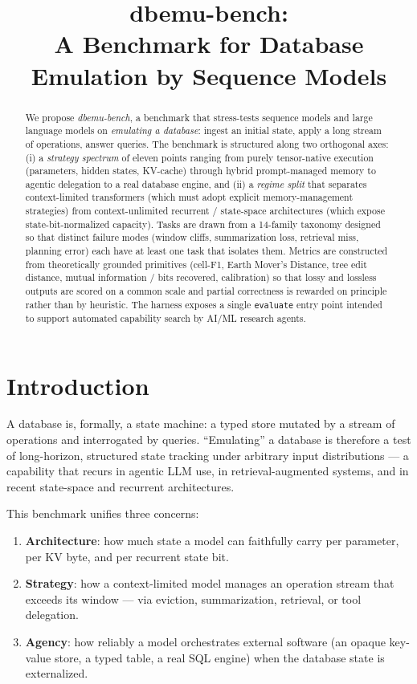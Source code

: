 \documentclass[11pt]{article}
\title{\textbf{dbemu-bench}: \\
A Benchmark for Database Emulation by Sequence Models}
\author{}
\date{}
\begin{document}
\maketitle

\begin{abstract}
We propose \emph{dbemu-bench}, a benchmark that stress-tests sequence
models and large language models on \emph{emulating a database}: ingest an
initial state, apply a long stream of operations, answer queries. The
benchmark is structured along two orthogonal axes: (i) a
\emph{strategy spectrum} of eleven points ranging from purely
tensor-native execution (parameters, hidden states, KV-cache) through
hybrid prompt-managed memory to agentic delegation to a real database
engine, and (ii) a \emph{regime split} that separates context-limited
transformers (which must adopt explicit memory-management strategies) from
context-unlimited recurrent / state-space architectures (which expose
state-bit-normalized capacity). Tasks are drawn from a 14-family taxonomy
designed so that distinct failure modes (window cliffs, summarization
loss, retrieval miss, planning error) each have at least one task that
isolates them. Metrics are constructed from theoretically grounded
primitives (cell-F1, Earth Mover's Distance, tree edit distance, mutual
information / bits recovered, calibration) so that lossy and lossless
outputs are scored on a common scale and partial correctness is rewarded
on principle rather than by heuristic. The harness exposes a single
\texttt{evaluate} entry point intended to support automated capability
search by AI/ML research agents.
\end{abstract}

\section{Introduction}

A database is, formally, a state machine: a typed store mutated by a
stream of operations and interrogated by queries. ``Emulating'' a
database is therefore a test of long-horizon, structured state tracking
under arbitrary input distributions --- a capability that recurs in
agentic LLM use, in retrieval-augmented systems, and in recent
state-space and recurrent architectures.

This benchmark unifies three concerns:

\begin{enumerate}[leftmargin=*]
  \item \textbf{Architecture}: how much state a model can faithfully
        carry per parameter, per KV byte, and per recurrent state bit.
  \item \textbf{Strategy}: how a context-limited model manages an
        operation stream that exceeds its window --- via eviction,
        summarization, retrieval, or tool delegation.
  \item \textbf{Agency}: how reliably a model orchestrates external
        software (an opaque key-value store, a typed table, a real SQL
        engine) when the database state is externalized.
\end{enumerate}
\end{document}

